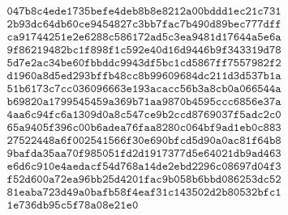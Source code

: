 \documentclass[11pt]{llncs}
\begin{document}
\[\begin{aligned}
& \texttt{047b8c4ede1735befe4deb8b8e8212a00bddd1ec21c731}\\                                                             & \texttt{2b93dc64db60ce9454827c3bb7fac7b490d89bec777dff}\\                                                             & \texttt{ca91744251e2e6288c586172ad5c3ea9481d17644a5e6a}\\                                                             & \texttt{9f86219482bc1f898f1c592e40d16d9446b9f343319d78}\\                                                             & \texttt{5d7e2ac34be60fbbddc9943df5bc1cd5867ff7557982f2}\\                                                             & \texttt{d1960a8d5ed293bffb48cc8b99609684dc211d3d537b1a}\\                                                             & \texttt{51b6173c7cc036096663e193acacc56b3a8cb0a066544a}\\                                                             & \texttt{b69820a1799545459a369b71aa9870b4595ccc6856e37a}\\                                                             & \texttt{4aa6c94fc6a1309d0a8c547ce9b2ccd8769037f5adc2c0}\\                                                             & \texttt{65a9405f396c00b6adea76faa8280c064bf9ad1eb0c883}\\                                                             & \texttt{27522448a6f002541566f30e690bfcd5d90a0ac81f64b8}\\                                                             & \texttt{9bafda35aa70f985051fd2d1917377d5e64021db9ad463}\\                                                             & \texttt{e6d6c910e4aedacf54d768a14de2ebd2296c08697d04f3}\\                                                             & \texttt{f52d600a72ea96bb25d4201fac9b058b6bbd086253dc52}\\                                                             & \texttt{81eaba723d49a0bafb58f4eaf31c143502d2b80532bfc1}\\                                                             & \texttt{1e736db95c5f78a08e21e0}\\
\end{aligned}\]
\end{document}
